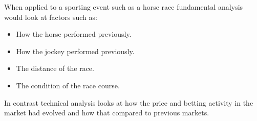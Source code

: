 	When applied to a sporting event such as a horse race fundamental analysis would look at factors such as:
	\begin{itemize}
		\item How the horse performed previously.
		\item How the jockey performed previously.
		\item The distance of the race.
		\item The condition of the race course.
	\end{itemize}	
	 
	 In contrast technical analysis looks at how the price and betting activity in the market had evolved and how that compared to previous markets.
	
	